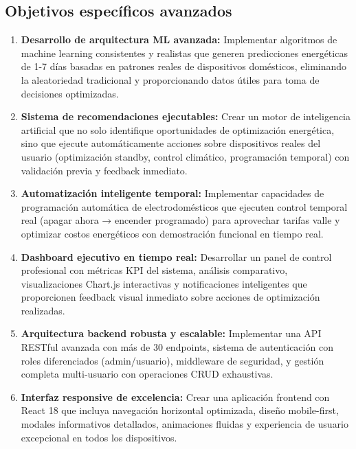 \subsection{Objetivos específicos avanzados}

\begin{enumerate}
    \item \textbf{Desarrollo de arquitectura ML avanzada:} Implementar algoritmos de machine learning consistentes y realistas que generen predicciones energéticas de 1-7 días basadas en patrones reales de dispositivos domésticos, eliminando la aleatoriedad tradicional y proporcionando datos útiles para toma de decisiones optimizadas.
    
    \item \textbf{Sistema de recomendaciones ejecutables:} Crear un motor de inteligencia artificial que no solo identifique oportunidades de optimización energética, sino que ejecute automáticamente acciones sobre dispositivos reales del usuario (optimización standby, control climático, programación temporal) con validación previa y feedback inmediato.
    
    \item \textbf{Automatización inteligente temporal:} Implementar capacidades de programación automática de electrodomésticos que ejecuten control temporal real (apagar ahora → encender programado) para aprovechar tarifas valle y optimizar costos energéticos con demostración funcional en tiempo real.
    
    \item \textbf{Dashboard ejecutivo en tiempo real:} Desarrollar un panel de control profesional con métricas KPI del sistema, análisis comparativo, visualizaciones Chart.js interactivas y notificaciones inteligentes que proporcionen feedback visual inmediato sobre acciones de optimización realizadas.
    
    \item \textbf{Arquitectura backend robusta y escalable:} Implementar una API RESTful avanzada con más de 30 endpoints, sistema de autenticación con roles diferenciados (admin/usuario), middleware de seguridad, y gestión completa multi-usuario con operaciones CRUD exhaustivas.
    
    \item \textbf{Interfaz responsive de excelencia:} Crear una aplicación frontend con React 18 que incluya navegación horizontal optimizada, diseño mobile-first, modales informativos detallados, animaciones fluidas y experiencia de usuario excepcional en todos los dispositivos.
    

\end{enumerate}

